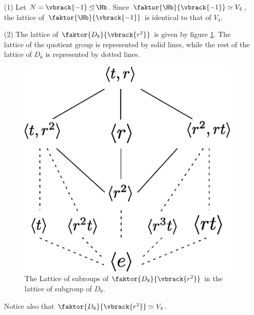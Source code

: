 \begin{example}\label{3.7}
    \begin{enumerate}
        \item[(1)] Let $N=\vbrack{-1} \unlhd \Hb$. Since
            $\faktor{\Hb}{\vbrack{-1}} \simeq V_4$, the lattice of
            $\faktor{\Hb}{\vbrack{-1}}$ is identical to that of $V_4$.

        \item[(2)] The lattice of $\faktor{D_8}{\vbrack{r^2}}$ is given by
            figure \ref{fig_3.4}. The lattice of the quotient group is
            represented by solid lines, while the rest of the lattice of $D_8$
            is represented by dotted lines.

            \begin{figure}[h]
                \centering
                \includegraphics[scale = 0.5]{Figures/Chapter3/D_8_quotient_lattice.eps}
                \caption{The Lattice of subroups of $\faktor{D_8}{\vbrack{r^2}}$
                in the lattice of subgroup of $D_8$.}
                \label{fig_3.4}
            \end{figure}
            Notice also that $\faktor{D_8}{\vbrack{r^2}} \simeq V_4$.
    \end{enumerate}
\end{example}
